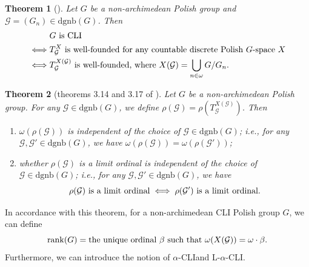 \documentclass[11pt]{amsart}
\newtheorem{theorem}{Theorem}[section]
\theoremstyle{definition}
\theoremstyle{remark}
\numberwithin{equation}{section}
\def\rank{{\mathrm{rank}}}
\def\dgnb{{\mathrm{dgnb}}}
\def\hier#1{$#1$-CLI}
\def\otr#1#2{T_{\mathcal{#1}}^{#2}}
\def\itx#1{{\mbox{\textrm{ #1 }}}}
\def\itxr#1{{\mbox{\textrm{ #1}}}}
\def\itxl#1{{\mbox{\textrm{#1 }}}}
\begin{document}
\begin{theorem}[{\cite[Corollary 3.13]{DingW}}]\label{relationship between CLI groups and orbit trees}
    Let $G$ be a non-archimedean Polish group and $\mathcal{G}=(G_n)\in\dgnb(G)$. Then
    \begin{align*}
        &G\itx{is CLI}\\
        \iff&\otr{G}{X}\itx{is well-founded for any countable discrete Polish}G\itxl{-space}X\\
        \iff&\otr{G}{X(\mathcal{G})}\itx{is well-founded, where}X(\mathcal{G})=\bigcup_{n\in\omega}G/G_n.
    \end{align*}
\end{theorem}

\begin{theorem}[theorems 3.14 and 3.17 of \cite{DingW}]
    Let $G$ be a non-archimedean Polish group. For any $\mathcal{G}\in\dgnb(G)$, we define $\rho(\mathcal{G})=\rho(\otr{G}{X(\mathcal{G})})$. Then
    \begin{enumerate}
        \item $\omega(\rho(\mathcal{G}))$ is independent of the choice of $\mathcal{G}\in\dgnb(G)$; i.e., for any $\mathcal{G},\mathcal{G}'\in\dgnb(G)$, we have $\omega(\rho(\mathcal{G}))=\omega(\rho(\mathcal{G}'))$;
        \item whether $\rho(\mathcal{G})$ is a limit ordinal is independent of the choice of $\mathcal{G}\in\dgnb(G)$; i.e., for any $\mathcal{G},\mathcal{G}'\in\dgnb(G)$, we have
        $$\rho(\mathcal{G})\itxr{is a limit ordinal}\iff\rho(\mathcal{G}')\itxr{is a limit ordinal}.$$
    \end{enumerate}
\end{theorem}
In accordance with this theorem, for a non-archimedean CLI Polish group $G$, we can define
$$\rank(G)=\itxl{the unique ordinal}\beta\itx{such that}\omega(X(\mathcal{G}))=\omega\cdot\beta.$$
Furthermore, we can introduce the notion of \hier\alpha\space and L-\hier\alpha.
\end{document}

